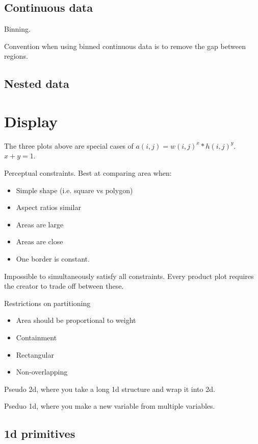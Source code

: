 \documentclass[letterpaper,oneside]{scrartcl}
\begin{document}
\subsection{Continuous data}
\label{sub:continuous_data}

Binning. 

Convention when using binned continuous data is to remove the gap between regions.

\subsection{Nested data}
\label{sub:nested_data}

\section{Display}
\label{sec:display}


The three plots above are special cases of $a(i, j) = w(i, j)^x * h(i, j)^y$.  $x + y = 1$.

Perceptual constraints.  Best at comparing area when:

\begin{itemize}
  \item Simple shape (i.e. square vs polygon)
  \item Aspect ratios similar
  \item Areas are large
  \item Areas are close
  \item One border is constant.
\end{itemize}

Impossible to simultaneously satisfy all constraints.  Every product plot requires the creator to trade off between these.

Restrictions on partitioning

\begin{itemize}
  \item Area should be proportional to weight
  \item Containment
  \item Rectangular
  \item Non-overlapping
\end{itemize}

Pseudo 2d, where you take a long 1d structure and wrap it into 2d.

Pseduo 1d, where you make a new variable from multiple variables.

\subsection{1d primitives}
\end{document}
